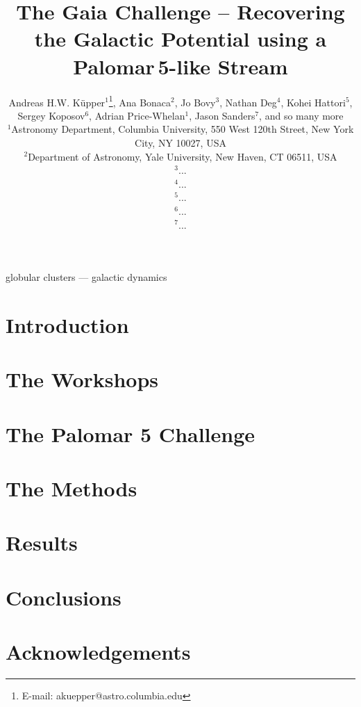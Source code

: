 \documentclass[useAMS,usenatbib]{mn2e}
\title[Gaia Challenge -- Palomar\,5]{The Gaia Challenge -- Recovering the Galactic Potential using a Palomar\,5-like Stream}
\author[K\"upper et al.]
{Andreas H.W. K\"{u}pper$^{1}$\thanks{
E-mail: \mbox{akuepper@astro.columbia.edu}}, Ana Bonaca$^{2}$, Jo Bovy$^{3}$, Nathan Deg$^{4}$, Kohei Hattori$^{5}$, \newauthor
Sergey Koposov$^{6}$, Adrian Price-Whelan$^{1}$, Jason Sanders$^{7}$,
and so many more\\
$^{1}$Astronomy Department, Columbia University, 550 West 120th Street, New York City, NY 10027, USA\\
$^{2}$Department of Astronomy, Yale University, New Haven, CT 06511, USA\\
$^{3}$...\\
$^{4}$...\\
$^{5}$...\\
$^{6}$...\\
$^{7}$...\\
}
\begin{document}


\maketitle

\label{firstpage}

\begin{abstract}

\end{abstract}




\begin{keywords}
globular clusters --- galactic dynamics
\end{keywords}





\section{Introduction}



\section{The Workshops}



\section{The Palomar 5 Challenge}



\section{The Methods}



\section{Results}



\section{Conclusions}



\section*{Acknowledgements}


\begin{thebibliography}{99}

\end{thebibliography}



\bsp \label{lastpage} 
\end{document}

